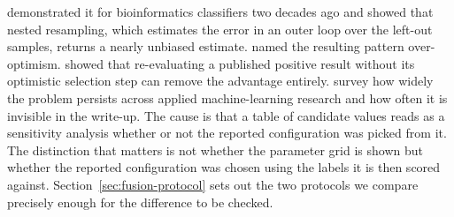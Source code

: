 \citet{varma2006bias} demonstrated it for bioinformatics classifiers two decades
ago and showed that nested resampling, which estimates the error in an outer
loop over the left-out samples, returns a nearly unbiased estimate.
\citet{boulesteix2009overoptimism}
named the resulting pattern over-optimism. \citet{jelizarow2010overoptimism}
showed that re-evaluating a published positive result without its optimistic
selection step can remove the advantage entirely. \citet{kapoor2023leakage}
survey how widely the problem persists across applied machine-learning research
and how often it is invisible in the write-up. The cause is that a table of candidate
values reads as a sensitivity analysis whether or not the reported
configuration was picked from it. The distinction that matters is not whether
the parameter grid is shown but whether
the reported configuration was chosen using the labels it is then scored
against. Section~\ref{sec:fusion-protocol} sets out the two protocols we compare
precisely enough for the difference to be checked.
